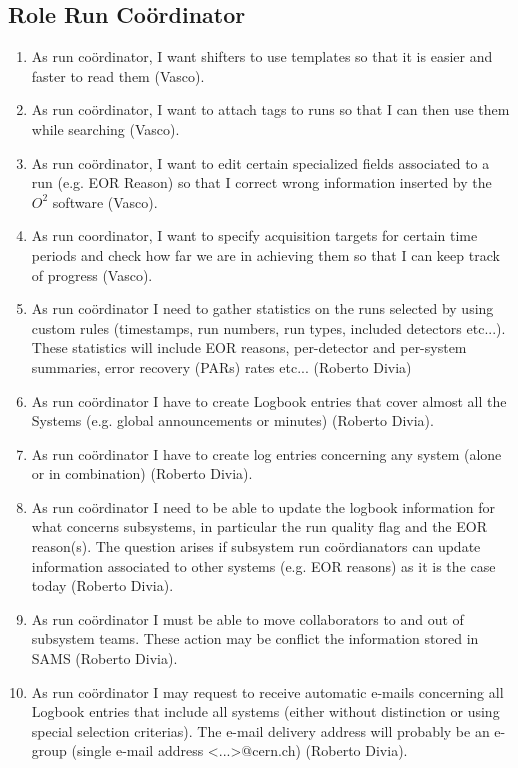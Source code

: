 \documentclass[a4paper,11pt]{book}
\begin{document}
\subsection{Role Run Co\"ordinator}
\begin{enumerate}
  \item As run co\"ordinator, I want shifters to use templates so that it is easier and faster to read them (Vasco). 
  \item As run co\"ordinator, I want to attach tags to runs so that I can then use them while searching (Vasco). 
  \item As run co\"ordinator, I want to edit certain specialized fields associated to a run (e.g. EOR Reason) so that I correct wrong information inserted by the $O^2$ software (Vasco). 
  \item As run coordinator, I want to specify acquisition targets for certain time periods and check how far we are in achieving them so that I can keep track of progress (Vasco). 
  \item As run co\"ordinator I need to gather statistics on the runs selected by using custom rules (timestamps, run numbers, run types, included detectors etc...). These statistics will include EOR reasons, per-detector and per-system summaries, error recovery (PARs) rates etc... (Roberto Divia)
  \item As run co\"ordinator I have to create Logbook entries that cover almost all the Systems (e.g. global announcements or minutes) (Roberto Divia).
  \item As run co\"ordinator I have to create log entries concerning any system (alone or in combination) (Roberto Divia).
  \item As run co\"ordinator I need to be able to update the logbook information for what concerns subsystems, in particular the run quality flag and the EOR reason(s). The question arises if subsystem run co\"ordianators can update information associated to other systems (e.g. EOR reasons) as it is the case today (Roberto Divia).
  \item As run co\"ordinator I must be able to move collaborators to and out of subsystem teams. These action may be conflict the information stored in SAMS (Roberto Divia).
  \item As run co\"ordinator I may request to receive automatic e-mails concerning all Logbook entries that include all systems (either without distinction or using special selection criterias). The e-mail delivery address will probably be an e-group (single e-mail address <...>@cern.ch) (Roberto Divia).

\end{enumerate}
\end{document}
